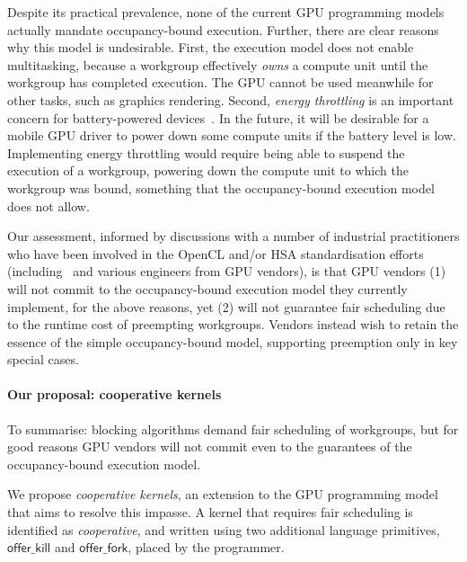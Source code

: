 \documentclass[numbers,nocopyrightspace,10pt]{sigplanconf}
\newcommand{\offerfork}{\mathsf{offer\_fork}}
\newcommand{\offerkill}{\mathsf{offer\_kill}}
\begin{document}
Despite its practical prevalence, none of the current GPU programming
models actually mandate occupancy-bound execution.  Further, there are
clear reasons why this model is undesirable.
First, the execution model does not enable
multitasking, because a workgroup effectively \emph{owns} a compute
unit until the workgroup has completed execution.  The GPU cannot be used meanwhile for other
tasks, such as graphics rendering.
Second, \emph{energy throttling} is
an important concern for battery-powered devices~\cite{DBLP:journals/comsur/Vallina-RodriguezC13}.  In the future, it will be desirable for a mobile GPU driver to
power down some compute units if the battery level is low.
Implementing energy
throttling would require being able to suspend the execution of a
workgroup, powering down the compute unit to which the workgroup was
bound, something that the occupancy-bound execution model does not allow.

Our assessment, informed by discussions with a number of industrial
practitioners who have been involved in the OpenCL and/or HSA
standardisation efforts
(including~\cite{PersonalCommunicationRichards,PersonalCommunicationHowes}
and various engineers from GPU vendors), is that GPU vendors (1) will
not commit to the occupancy-bound execution model they currently
implement, for the above reasons,
yet (2) will not guarantee fair scheduling due to the
runtime cost of preempting
workgroups.  Vendors instead wish to
retain the essence of the simple occupancy-bound model, supporting preemption
only in key special cases.


\vspace{-1mm}
\paragraph{Our proposal: cooperative kernels}
%
To summarise: blocking algorithms
demand fair scheduling of workgroups, but for good reasons
GPU vendors will not commit even to the guarantees of the
occupancy-bound execution model.

We propose \emph{cooperative kernels}, an extension to the GPU
programming model that aims to resolve this impasse.  A kernel
that requires fair scheduling is identified as \emph{cooperative}, and written using two additional
language primitives, $\offerkill$ and $\offerfork$, placed by the programmer.
\end{document}
